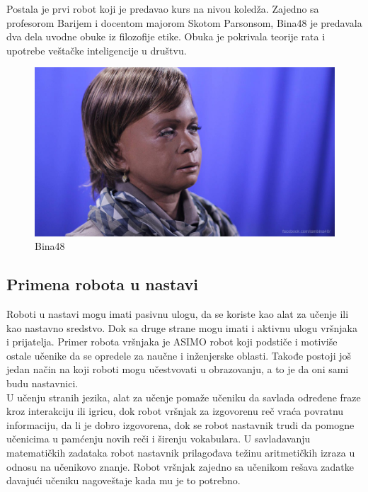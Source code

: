 \documentclass[a4paper]{article}
\begin{document}
Postala je prvi robot koji je predavao kurs na nivou koledža. Zajedno sa profesorom Barijem i docentom majorom Skotom Parsonsom, Bina48 je predavala dva dela uvodne obuke iz filozofije etike. Obuka je pokrivala teorije rata i upotrebe veštačke inteligencije u društvu. 
 
\begin{figure}[ht!]
\begin{center}
\includegraphics[scale=0.3]{Bina48.jpg}
\end{center}
\caption{Bina48}
\label{fig:bina48}
\end{figure}

\newpage
\subsection{Primena robota u nastavi}
\label{subsec:podnaslov2}

Roboti u nastavi mogu imati pasivnu ulogu, da se koriste kao alat za učenje ili kao nastavno sredstvo. Dok sa druge strane mogu imati i aktivnu ulogu vršnjaka i prijatelja. Primer robota vršnjaka je ASIMO robot koji podstiče i motiviše ostale učenike da se opredele za naučne i inženjerske oblasti. Takođe postoji još jedan način na koji roboti mogu učestvovati u obrazovanju, a to je da oni sami budu nastavnici. \\
U učenju stranih jezika, alat za učenje pomaže učeniku da savlada određene fraze kroz interakciju ili igricu, dok robot vršnjak za izgovorenu reč vraća povratnu informaciju, da li je dobro izgovorena, dok se robot nastavnik trudi da pomogne učenicima u pamćenju novih reči i širenju vokabulara. 
U savladavanju matematičkih zadataka robot nastavnik prilagođava težinu aritmetičkih izraza u odnosu na učenikovo znanje. Robot vršnjak zajedno sa učenikom rešava zadatke davajući učeniku nagoveštaje kada mu je to potrebno.
\end{document}
